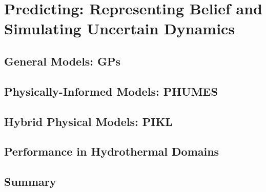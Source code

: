 \chapter{Predicting: Representing Belief and Simulating Uncertain Dynamics}

\section{General Models: GPs}

\section{Physically-Informed Models: PHUMES}

\section{Hybrid Physical Models: PIKL}

\section{Performance in Hydrothermal Domains}

\section{Summary}